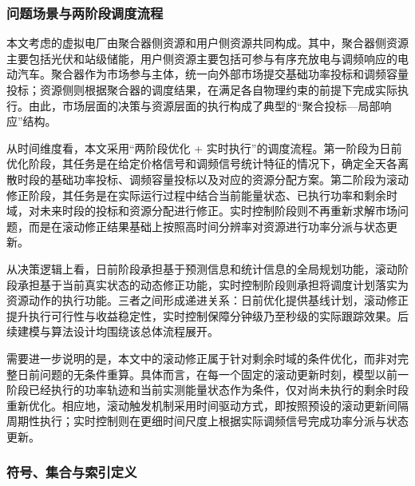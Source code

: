 \subsubsection{问题场景与两阶段调度流程}
\label{subsubsec:vpp_admm_model_two_stage_process}

本文考虑的虚拟电厂由聚合器侧资源和用户侧资源共同构成。其中，聚合器侧资源主要包括光伏和站级储能，用户侧资源主要包括可参与有序充放电与调频响应的电动汽车。聚合器作为市场参与主体，统一向外部市场提交基础功率投标和调频容量投标；资源侧则根据聚合器的调度结果，在满足各自物理约束的前提下完成实际执行。由此，市场层面的决策与资源层面的执行构成了典型的“聚合投标—局部响应”结构。

从时间维度看，本文采用“两阶段优化 + 实时执行”的调度流程。第一阶段为日前优化阶段，其任务是在给定价格信号和调频信号统计特征的情况下，确定全天各离散时段的基础功率投标、调频容量投标以及对应的资源分配方案。第二阶段为滚动修正阶段，其任务是在实际运行过程中结合当前能量状态、已执行功率和剩余时域，对未来时段的投标和资源分配进行修正。实时控制阶段则不再重新求解市场问题，而是在滚动修正结果基础上按照高时间分辨率对资源进行功率分派与状态更新。

从决策逻辑上看，日前阶段承担基于预测信息和统计信息的全局规划功能，滚动阶段承担基于当前真实状态的动态修正功能，实时控制阶段则承担将调度计划落实为资源动作的执行功能。三者之间形成递进关系：日前优化提供基线计划，滚动修正提升执行可行性与收益稳定性，实时控制保障分钟级乃至秒级的实际跟踪效果。后续建模与算法设计均围绕该总体流程展开。

需要进一步说明的是，本文中的滚动修正属于针对剩余时域的条件优化，而非对完整日前问题的无条件重算。具体而言，在每一个固定的滚动更新时刻，模型以前一阶段已经执行的功率轨迹和当前实测能量状态作为条件，仅对尚未执行的剩余时段重新优化。相应地，滚动触发机制采用时间驱动方式，即按照预设的滚动更新间隔周期性执行；实时控制则在更细时间尺度上根据实际调频信号完成功率分派与状态更新。

\subsubsection{符号、集合与索引定义}
\label{subsubsec:vpp_admm_model_two_stage_notation}

